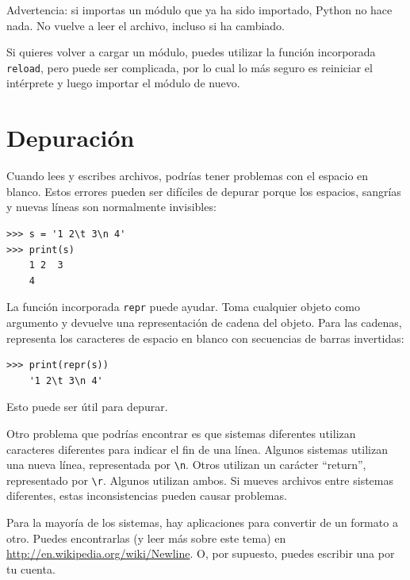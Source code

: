 \documentclass[10pt]{book}
\begin{document}
Advertencia: si importas un módulo que ya ha sido importado,
Python no hace nada.  No vuelve a leer el archivo, incluso si ha
cambiado.

Si quieres volver a cargar un módulo, puedes utilizar la función incorporada
{\tt reload}, pero puede ser complicada, por lo cual lo más seguro es
reiniciar el intérprete y luego importar el módulo de nuevo.


\section{Depuración}

Cuando lees y escribes archivos, podrías tener problemas
con el espacio en blanco.  Estos errores pueden ser difíciles de depurar porque los espacios,
sangrías y nuevas líneas son normalmente invisibles:

\begin{verbatim}
>>> s = '1 2\t 3\n 4'
>>> print(s)
    1 2	 3
    4
\end{verbatim}

La función incorporada {\tt repr} puede ayudar.  Toma cualquier objeto como
argumento y devuelve una representación de cadena del objeto.  Para
las cadenas, representa los caracteres de
espacio en blanco con secuencias de barras invertidas:

\begin{verbatim}
>>> print(repr(s))
    '1 2\t 3\n 4'
\end{verbatim}

Esto puede ser útil para depurar.

Otro problema que podrías encontrar es que sistemas diferentes
utilizan caracteres diferentes para indicar el fin de una línea.  Algunos
sistemas utilizan una nueva línea, representada por \verb"\n".  Otros utilizan
un carácter ``return'', representado por \verb"\r".  Algunos utilizan ambos.
Si mueves archivos entre sistemas diferentes, estas inconsistencias
pueden causar problemas.


Para la mayoría de los sistemas, hay aplicaciones para convertir de
un formato a otro.  Puedes encontrarlas (y leer más sobre este
tema) en \url{http://en.wikipedia.org/wiki/Newline}.  O, por supuesto,
puedes escribir una por tu cuenta.
\end{document}
